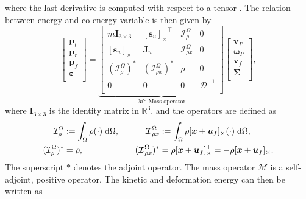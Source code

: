 \documentclass{svjour3}                     %
\newcommand{\crmat}[1]{\ensuremath{[#1]_{\times}}}
\begin{document}
where the last derivative is computed with respect to a tensor \cite{BRUGNOLI2019940}.
The relation between energy and co-energy variable is then given by
\begin{equation}
\label{eq:mass_op}
\begin{bmatrix}
\bm{p}_t \\ \bm{p}_r \\ \bm{p}_f \\ \bm\varepsilon \\
\end{bmatrix} = 
\underbrace{\begin{bmatrix}
	m \bm{I}_{3\times 3} & \crmat{\bm{s}_u}^\top & \mathcal{I}_\rho^{\Omega} & 0 \\
	\crmat{\bm{s}_u} & \bm{J}_u & \bm{\mathcal{I}}_{\rho x}^{\Omega} & 0  \\
	(\mathcal{I}_\rho^{\Omega})^* & (\bm{\mathcal{I}}_{\rho x}^{\Omega})^* & \rho & 0  \\
	0 & 0 & 0 & \bm{\mathcal{D}}^{-1} \\
	\end{bmatrix}}_{\bm{\mathcal{M}}: \; \text{Mass operator}}
\begin{bmatrix}
\bm{v}_P \\ \bm{\omega}_P  \\ \bm{v}_f  \\ \bm\Sigma \\
\end{bmatrix},
\end{equation}
where $\bm{I}_{3\times 3}$ is the identity matrix in $\mathbb{R}^3$. and the operators are defined as
\begin{equation*}
\begin{aligned}
\mathcal{I}_\rho^\Omega &:=\int_{\Omega} \rho (\cdot) \d{\Omega}, \\
(\mathcal{I}_\rho^{\Omega})^* &= \rho, \\
\end{aligned} \qquad
\begin{aligned} 
\bm{\mathcal{I}}_{\rho x}^{\Omega} &:= \int_\Omega \rho \crmat{\bm{x}+\bm{u}_f} (\cdot) \d{\Omega}, \\
(\bm{\mathcal{I}}_{\rho x}^{\Omega})^* &= \rho \crmat{\bm{x}+\bm{u}_f}^\top= -\rho \crmat{\bm{x}+\bm{u}_f}. \\
\end{aligned}
\end{equation*}
The superscript $*$ denotes the adjoint operator. The mass operator $\bm{\mathcal{M}}$ is a self-adjoint, positive operator. The kinetic and deformation energy can then be written as
\end{document}
